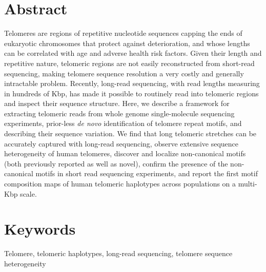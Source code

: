 \documentclass{article}
\begin{document}
\section*{Abstract} 
    Telomeres are regions of repetitive nucleotide sequences capping the ends of eukaryotic chromosomes that protect against deterioration,
        and whose lengths can be correlated with age and adverse health risk factors.
    Given their length and repetitive nature,
        telomeric regions are not easily reconstructed from short-read sequencing,
        making telomere sequence resolution a very costly and generally intractable problem.
    Recently, long-read sequencing, with read lengths measuring in hundreds of Kbp,
        has made it possible to routinely read into telomeric regions and inspect their sequence structure.
    Here, we describe a framework for
        extracting telomeric reads from whole genome single-molecule sequencing experiments,
        prior-less \textit{de novo} identification of telomere repeat motifs,
        and describing their sequence variation.
    We find that
        long telomeric stretches can be accurately captured with long-read sequencing,
        observe extensive sequence heterogeneity of human telomeres,
        discover and localize non-canonical motifs (both previously reported as well as novel),
        confirm the presence of the non-canonical motifs in short read sequencing experiments,
        and report the first motif composition maps of human telomeric haplotypes across populations on a multi-Kbp scale.

\section*{Keywords} 
    Telomere, telomeric haplotypes, long-read sequencing, telomere sequence heterogeneity

\pagebreak
\doublespacing
\end{document}
